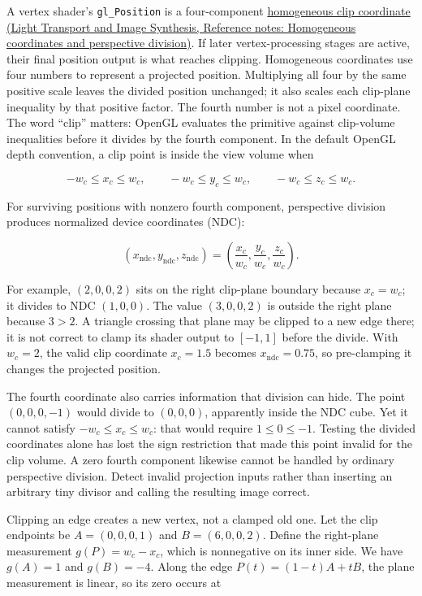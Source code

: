 A vertex shader's \texttt{gl\_Position} is a four-component \href{../04-Light-Transport-and-Image-Synthesis/main.pdf\#nameddest=appendix-cb3b26862282}{homogeneous clip coordinate (Light Transport and Image Synthesis, Reference notes: Homogeneous coordinates and perspective division)}. If later vertex-processing stages are active, their final position output is what reaches clipping. Homogeneous coordinates use four numbers to represent a projected position. Multiplying all four by the same positive scale leaves the divided position unchanged; it also scales each clip-plane inequality by that positive factor. The fourth number is not a pixel coordinate. The word ``clip'' matters: OpenGL evaluates the primitive against clip-volume inequalities before it divides by the fourth component. In the default OpenGL depth convention, a clip point is inside the view volume when

\[
-w_c\le x_c\le w_c,\qquad
-w_c\le y_c\le w_c,\qquad
-w_c\le z_c\le w_c.
\]

For surviving positions with nonzero fourth component, perspective division produces normalized device coordinates (NDC):

\[
(x_{\mathrm{ndc}},y_{\mathrm{ndc}},z_{\mathrm{ndc}})=
\left(\frac{x_c}{w_c},\frac{y_c}{w_c},\frac{z_c}{w_c}\right).
\]

For example, \((2,0,0,2)\) sits on the right clip-plane boundary because \(x_c=w_c\); it divides to NDC \((1,0,0)\). The value \((3,0,0,2)\) is outside the right plane because \(3>2\). A triangle crossing that plane may be clipped to a new edge there; it is not correct to clamp its shader output to \([-1,1]\) before the divide. With \(w_c=2\), the valid clip coordinate \(x_c=1.5\) becomes \(x_{\mathrm{ndc}}=0.75\), so pre-clamping it changes the projected position.

The fourth coordinate also carries information that division can hide. The point \((0,0,0,-1)\) would divide to \((0,0,0)\), apparently inside the NDC cube. Yet it cannot satisfy \(-w_c\leq x_c\leq w_c\): that would require \(1\leq0\leq-1\). Testing the divided coordinates alone has lost the sign restriction that made this point invalid for the clip volume. A zero fourth component likewise cannot be handled by ordinary perspective division. Detect invalid projection inputs rather than inserting an arbitrary tiny divisor and calling the resulting image correct.

Clipping an edge creates a new vertex, not a clamped old one. Let the clip endpoints be \(A=(0,0,0,1)\) and \(B=(6,0,0,2)\). Define the right-plane measurement \(g(P)=w_c-x_c\), which is nonnegative on its inner side. We have \(g(A)=1\) and \(g(B)=-4\). Along the edge \(P(t)=(1-t)A+tB\), the plane measurement is linear, so its zero occurs at

